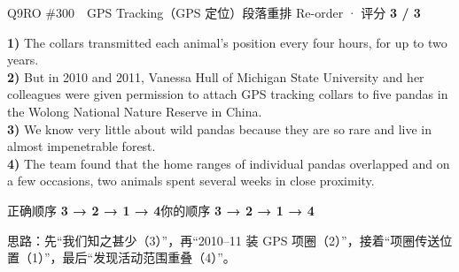 \begin{qblock}{Q9\quad RO \#300\ \ GPS Tracking（GPS 定位）}{段落重排 Re-order · 评分 \textcolor{cAccent}{\bfseries 3 / 3}}
\begin{promptbox}\small
\textbf{1)} The collars transmitted each animal's position every four hours, for up to two years.\\[2pt]
\textbf{2)} But in 2010 and 2011, Vanessa Hull of Michigan State University and her colleagues were given permission to attach GPS tracking collars to five pandas in the Wolong National Nature Reserve in China.\\[2pt]
\textbf{3)} We know very little about wild pandas because they are so rare and live in almost impenetrable forest.\\[2pt]
\textbf{4)} The team found that the home ranges of individual pandas overlapped and on a few occasions, two animals spent several weeks in close proximity.
\end{promptbox}
\smallskip\par
{\small 正确顺序 \textcolor{cFix}{\bfseries 3 → 2 → 1 → 4}\qquad 你的顺序 \textcolor{cFix}{\bfseries 3 → 2 → 1 → 4}}
\par{\footnotesize\color{gray}思路：先“我们知之甚少（3）”，再“2010–11 装 GPS 项圈（2）”，接着“项圈传送位置（1）”，最后“发现活动范围重叠（4）”。}
\end{qblock}

